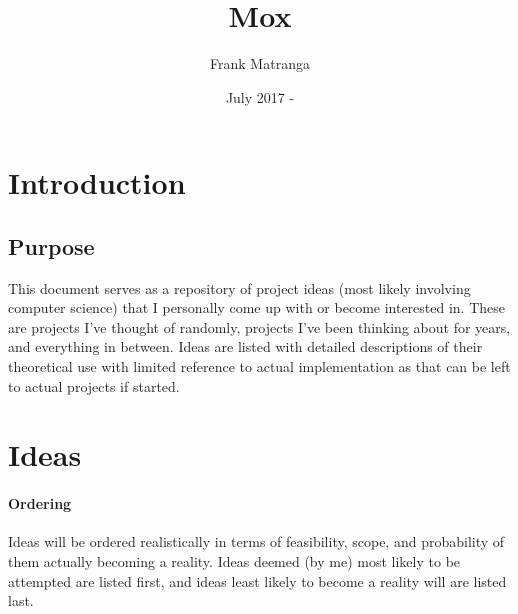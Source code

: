 \documentclass{article}[2017/07/09]
\title{Mox}
\author{Frank Matranga}
\date{July 2017 - }
\begin{document}
  \maketitle
  \newpage

  \tableofcontents
  \newpage

  \section{Introduction}
  \subsection{Purpose}
    This document serves as a repository of project ideas (most likely involving computer science) that I personally come up with or become interested in.
    These are projects I've thought of randomly, projects I've been thinking about for years, and everything in between.
    Ideas are listed with detailed descriptions of their theoretical use with limited reference to actual implementation as that can be left to actual projects if started.

  \section{Ideas}
  \paragraph{Ordering}
    Ideas will be ordered realistically in terms of feasibility, scope, and probability of them actually becoming a reality. Ideas deemed (by me) most likely to be attempted are listed first, and ideas least likely to become a reality will are listed last.
\end{document}
